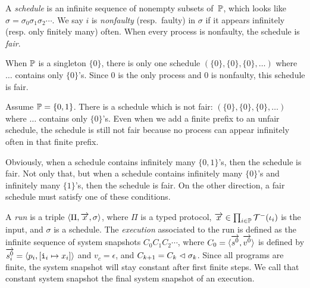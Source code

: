 A \textit{schedule} is an infinite sequence of nonempty subsets
of~$\mathbb{P}$,
which looks like $\sigma = \sigma_0\sigma_1\sigma_2\cdots$.
We say $i$ is \textit{nonfaulty} (resp.~faulty) in
$\sigma$ if it appears infinitely (resp. only finitely many) often.
When every process is nonfaulty, the schedule is \textit{fair}.
 \begin{example}
  \label{ex:schedules}
  When $\mathbb{P}$ is a singleton $\{0\}$, there is only one schedule
  $(\{0\},\{0\},\{0\},\ldots)$ where $\ldots$ contains only $\{0\}$'s.
  Since 0 is the only process and 0 is nonfaulty, this schedule is fair.

  Assume $\mathbb{P} = \{0,1\}$.
  There is a schedule which is not fair: $(\{0\}, \{0\}, \{0\}, \ldots)$
  where $\ldots$ contains only $\{0\}$'s.
  Even when we add a finite prefix to an unfair schedule, the schedule
  is still not fair because no process can appear infinitely often in that
  finite prefix.

  Obviously, when a schedule contains infinitely many
  $\{0,1\}$'s, then the schedule is fair.  Not only that, but when a
  schedule contains infinitely many $\{0\}$'s and infinitely many $\{1\}$'s,
  then the schedule is fair.  On the other direction, a fair schedule
  must satisfy one of these conditions.
 \end{example}

A \textit{run} is a triple $\langle{\Pi, \overrightarrow x, \sigma}\rangle$,
where $\Pi$ is a typed protocol,
$\overrightarrow x \in \prod_{i\in \mathbb{P}} \mathcal{T}^-(\iota_i)$ is the input,
and $\sigma$ is a schedule.
The \textit{execution} associated to the run
is defined as the infinite sequence of system snapshots
$C_0C_1C_2\cdots$, where $C_0 = \langle{\overrightarrow{s^0}, \overrightarrow{v^0}}\rangle$ is
defined by $\overrightarrow{s^0_i} = \langle{p_i, [\texttt{i}_i\mapsto x_i]}\rangle$ and
$v_c = \epsilon$, and $C_{k+1} = C_{k}\vartriangleleft\sigma_{k}$.
Since all programs are finite, the system snapshot will stay constant
after first finite steps.  We call that constant system snapshot the
final system snapshot of an execution.

